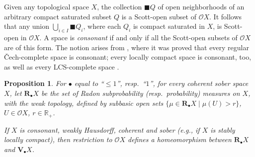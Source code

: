 \documentclass[preprint,12pt]{elsarticle}
\newcommand{\Rp}{\mathbb{R}_+}
\newcommand\Val{{\mathbf V}}
\newcommand\Open{{\mathcal O}}
\newtheorem{proposition}[theorem]{Proposition}
\begin{document}
Given any topological space $X$, the collection $\blacksquare Q$ of
open neighborhoods of an arbitrary compact saturated subset $Q$ is a
Scott-open subset of $\Open X$.  It follows that any union
$\bigcup_{i \in I} \blacksquare {Q_i}$, where each $Q_i$ is compact
saturated in $X$, is Scott-open in $\Open X$.  A space is
\emph{consonant} if and only if all the Scott-open subsets of
$\Open X$ are of this form.  The notion arises from
\cite{DGL:consonant}, where it was proved that every regular
\v{C}ech-complete space is consonant; every locally compact space is
consonant, too, as well as every LCS-complete space \cite[Proposition
12.1]{dBGLJL:LCScomplete}.
\begin{proposition}
  \label{prop:V=Radon}
  For $\bullet$ equal to ``$\leq 1$'', resp.\ ``$1$'', for every
  coherent sober space $X$, let $\mathbf R_\bullet X$ be the set of
  Radon subprobability (resp.\ probability) measures on $X$, with the
  \emph{weak topology}, defined by subbasic open sets
  $\{\mu \in \mathbf R_\bullet X \mid \mu (U) > r\}$, $U \in \Open X$,
  $r \in \Rp$.

  If $X$ is consonant, weakly Hausdorff, coherent and sober (e.g., if
  $X$ is stably locally compact), then restriction to $\Open X$
  defines a homeomorphism between $\mathbf R_\bullet X$ and
  $\Val_\bullet X$.
\end{proposition}
\end{document}
